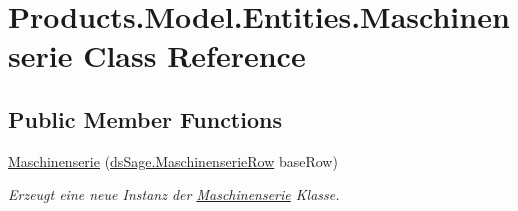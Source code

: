 \hypertarget{class_products_1_1_model_1_1_entities_1_1_maschinenserie}{}\section{Products.\+Model.\+Entities.\+Maschinenserie Class Reference}
\label{class_products_1_1_model_1_1_entities_1_1_maschinenserie}
\subsection*{Public Member Functions}
\begin{DoxyCompactItemize}
\item 
\hyperlink{class_products_1_1_model_1_1_entities_1_1_maschinenserie_a35581e661f7aace76b903818ce5e9656}{Maschinenserie} (\hyperlink{class_products_1_1_data_1_1ds_sage_1_1_maschinenserie_row}{ds\+Sage.\+Maschinenserie\+Row} base\+Row)
\begin{DoxyCompactList}\small\item\em Erzeugt eine neue Instanz der \hyperlink{class_products_1_1_model_1_1_entities_1_1_maschinenserie}{Maschinenserie} Klasse. \end{DoxyCompactList}\end{DoxyCompactItemize}
